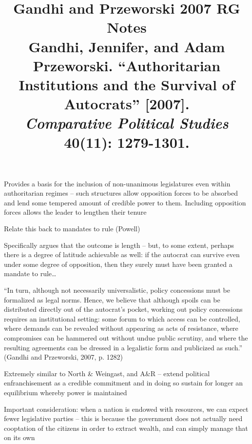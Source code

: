 \documentclass[12pt]{article}
\title{\textbf{Gandhi and Przeworski 2007 RG Notes}\\
\large Gandhi, Jennifer, and Adam Przeworski. ``Authoritarian Institutions and the Survival of Autocrats'' [2007].\\
\textit{Comparative Political Studies} 40(11): 1279-1301.}
\author{}
\date{}
\begin{document}
\maketitle

Provides a basis for the inclusion of non-unanimous legislatures even within authoritarian regimes -- such structures allow opposition forces to be absorbed and lend some tempered amount of credible power to them. Including opposition forces allows the leader to lengthen their tenure

Relate this back to mandates to rule (Powell)

Specifically argues that the outcome is length -- but, to some extent, perhaps there is a degree of latitude achievable as well: if the autocrat can survive even under some degree of opposition, then they surely must have been granted a mandate to rule\ldots{}

``In turn, although not necessarily universalistic, policy concessions must be formalized as legal norms. Hence, we believe that although spoils can be distributed directly out of the autocrat's pocket, working out policy concessions requires an institutional setting: some forum to which access can be controlled, where demands can be revealed without appearing as acts of resistance, where compromises can be hammered out without undue public scrutiny, and where the resulting agreements can be dressed in a legalistic form and publicized as such.'' (Gandhi and Przeworski, 2007, p. 1282)

Extremely similar to North \& Weingast, and A\&R -- extend political enfranchisement as a credible commitment and in doing so sustain for longer an equilibrium whereby power is maintained

Important consideration: when a nation is endowed with resources, we can expect fewer legislative parties -- this is because the government does not actually need cooptation of the citizens in order to extract wealth, and can simply manage that on its own
\end{document}
